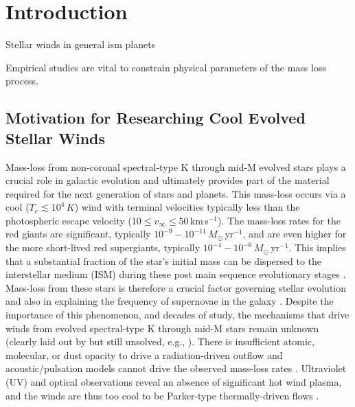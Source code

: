 \chapter{Introduction} \label{chap:1}

Stellar winds in general ism planets

Empirical studies are vital to constrain physical parameters of the mass loss process. 

\pagebreak

\section{Motivation for Researching Cool Evolved Stellar Winds}\label{sec:1.1}

Mass-loss from non-coronal spectral-type K through mid-M evolved stars plays a crucial role in galactic evolution and ultimately provides part of the material required for the next generation of stars and planets. This mass-loss occurs via a cool ($T_{e} \lesssim 10^4\,K$) wind with terminal velocities typically less than the photospheric escape velocity ($10 \leq v_{\infty} \leq 50$\,km\,s$^{-1}$). The mass-loss rates for the red giants are significant, typically $10^{-9}-10^{-11}$\,$M_{\odot}$\,yr$^{-1}$, and are even higher for the more short-lived red supergiants, typically $10^{-4}-10^{-6}$\,$M_{\odot}$\,yr$^{-1}$. This implies that a substantial fraction of the star's initial mass can be dispersed to the interstellar medium (ISM) during these post main sequence evolutionary stages \citep[e.g.,][]{schroder_2001}. Mass-loss from these stars is therefore a crucial factor governing stellar evolution \citep{chiosi_1986} and also in explaining the frequency of supernovae in the galaxy \citep{van_loon_2010}. Despite the importance of this phenomenon, and decades of study, the mechanisms that drive winds from evolved spectral-type K through mid-M stars remain unknown (clearly laid out by \citealt{holzer_1985} but still unsolved, e.g., \citealt{crowley_2009}). There is insufficient atomic, molecular, or dust opacity to drive a radiation-driven outflow \citep{zukerman_1995,jones_2008} and acoustic/pulsation models cannot drive the observed mass-loss rates \citep{sutmann_1995}. Ultraviolet (UV) and optical observations reveal an absence of significant hot wind plasma, and the winds are thus too cool to be Parker-type thermally-driven flows \cite[e.g.,][]{linsky_1979,haisch_1980,ayres_1981}. 

